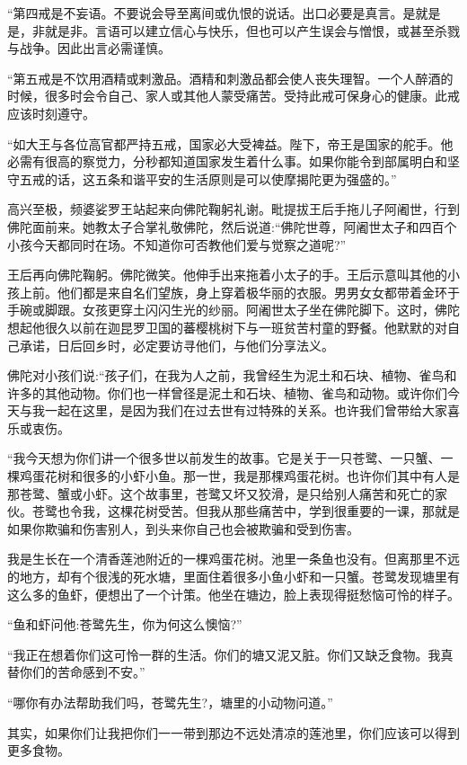 \documentclass[12pt,twoside,openany]{book}
\begin{document}
“第四戒是不妄语。不要说会导至离间或仇恨的说话。出口必要是真言。是就是是，非就是非。言语可以建立信心与快乐，但也可以产生误会与憎恨，或甚至杀戮与战争。因此出言必需谨慎。

“第五戒是不饮用酒精或剌激品。酒精和刺激品都会使人丧失理智。一个人醉酒的时候，很多时会令自己、家人或其他人蒙受痛苦。受持此戒可保身心的健康。此戒应该时刻遵守。

“如大王与各位高官都严持五戒，国家必大受裨益。陛下，帝王是国家的舵手。他必需有很高的察觉力，分秒都知道国家发生着什么事。如果你能令到部属明白和坚守五戒的话，这五条和谐平安的生活原则是可以使摩揭陀更为强盛的。”

高兴至极，频婆娑罗王站起来向佛陀鞠躬礼谢。毗提拔王后手拖儿子阿阇世，行到佛陀面前来。她教太子合掌礼敬佛陀，然后说道:“佛陀世尊，阿阇世太子和四百个小孩今天都同时在场。不知道你可否教他们爱与觉察之道呢?”

王后再向佛陀鞠躬。佛陀微笑。他伸手出来拖着小太子的手。王后示意叫其他的小孩上前。他们都是来自名们望族，身上穿着极华丽的衣服。男男女女都带着金环于手碗或脚跟。女孩更穿土闪闪生光的纱丽。阿阇世太子坐在佛陀脚下。这时，佛陀想起他很久以前在迦昆罗卫国的蕃樱桃树下与一班贫苦村童的野餐。他默默的对自己承诺，日后回乡时，必定要访寻他们，与他们分享法义。

佛陀对小孩们说:“孩子们，在我为人之前，我曾经生为泥土和石块、植物、雀鸟和许多的其他动物。你们也一样曾径是泥土和石块、植物、雀鸟和动物。或许你们今天与我一起在这里，是因为我们在过去世有过特殊的关系。也许我们曾带给大家喜乐或衷伤。

“我今天想为你们讲一个很多世以前发生的故事。它是关于一只苍鹭、一只蟹、一棵鸡蛋花树和很多的小虾小鱼。那一世，我是那棵鸡蛋花树。也许你们其中有人是那苍鹭、蟹或小虾。这个故事里，苍鹭又坏又狡滑，是只给别人痛苦和死亡的家伙。苍鹭也令我，这棵花树受苦。但我从那些痛苦中，学到很重要的一课，那就是如果你欺骗和伤害别人，到头来你自己也会被欺骗和受到伤害。

我是生长在一个清香莲池附近的一棵鸡蛋花树。池里一条鱼也没有。但离那里不远的地方，却有个很浅的死水塘，里面住着很多小鱼小虾和一只蟹。苍鹭发现塘里有这么多的鱼虾，便想出了一个计策。他坐在塘边，脸上表现得挺愁恼可怜的样子。

“鱼和虾问他:苍鹭先生，你为何这么懊恼?”

“我正在想着你们这可怜一群的生活。你们的塘又泥又脏。你们又缺乏食物。我真替你们的苦命感到不安。”

“哪你有办法帮助我们吗，苍鹭先生?，塘里的小动物问道。”

其实，如果你们让我把你们一一带到那边不远处清凉的莲池里，你们应该可以得到更多食物。
\end{document}
